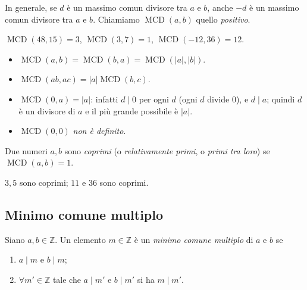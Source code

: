 \documentclass[11pt,a4paper]{article}
\begin{document}
\begin{osservazione}
In generale, se $d$ è un massimo comun divisore tra $a$ e $b$, anche $-d$ è un massimo comun divisore tra $a$ e $b$. Chiamiamo $\operatorname{MCD}(a, b)$ quello \emph{positivo}.
\end{osservazione}

\begin{esempio}
$\operatorname{MCD}(48, 15) = 3$, \quad $\operatorname{MCD}(3, 7) = 1$, \quad $\operatorname{MCD}(-12, 36) = 12$.
\end{esempio}

\begin{proprieta}
\begin{itemize}
  \item $\operatorname{MCD}(a, b) = \operatorname{MCD}(b, a) = \operatorname{MCD}(|a|, |b|)$.
  \item $\operatorname{MCD}(ab, ac) = |a|\operatorname{MCD}(b, c)$.
  \item $\operatorname{MCD}(0, a) = |a|$: infatti $d \mid 0$ per ogni $d$ (ogni $d$ divide $0$), e $d \mid a$; quindi $d$ è un divisore di $a$ e il più grande possibile è $|a|$.
  \item $\operatorname{MCD}(0, 0)$ \emph{non è definito}.
\end{itemize}
\end{proprieta}

\begin{definizione}
Due numeri $a, b$ sono \emph{coprimi} (o \emph{relativamente primi}, o \emph{primi tra loro}) se $\operatorname{MCD}(a, b) = 1$.
\end{definizione}

\begin{esempio}
$3, 5$ sono coprimi; $11$ e $36$ sono coprimi.
\end{esempio}

\subsection{Minimo comune multiplo}

\begin{definizione}
Siano $a, b \in \mathbb{Z}$. Un elemento $m \in \mathbb{Z}$ è un \emph{minimo comune multiplo} di $a$ e $b$ se
\begin{enumerate}
  \item[i)] $a \mid m$ e $b \mid m$;
  \item[ii)] $\forall m' \in \mathbb{Z}$ tale che $a \mid m'$ e $b \mid m'$ si ha $m \mid m'$.
\end{enumerate}
\end{definizione}
\end{document}
